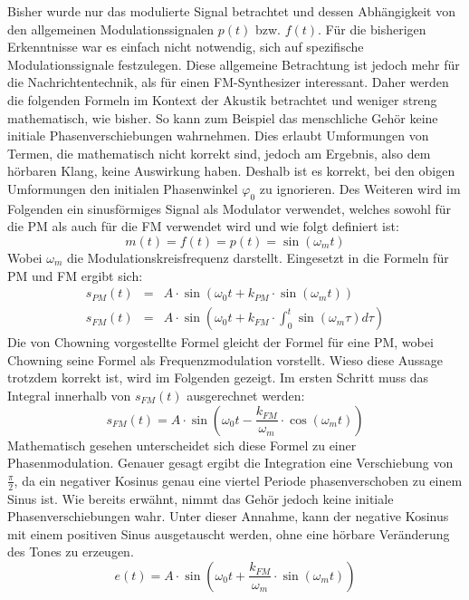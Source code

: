 Bisher wurde nur das modulierte Signal betrachtet und dessen Abhängigkeit von den allgemeinen Modulationssignalen \(p(t)\) bzw. \(f(t)\). Für die bisherigen Erkenntnisse war es einfach nicht notwendig, sich auf spezifische Modulationssignale festzulegen. Diese allgemeine Betrachtung ist jedoch mehr für die Nachrichtentechnik, als für einen FM-Synthesizer interessant.
Daher werden die folgenden Formeln im Kontext der Akustik betrachtet und weniger streng mathematisch, wie bisher. So kann zum Beispiel das menschliche Gehör keine initiale Phasenverschiebungen wahrnehmen. Dies erlaubt Umformungen von Termen, die mathematisch nicht korrekt sind, jedoch am Ergebnis, also dem hörbaren Klang, keine Auswirkung haben. Deshalb ist es korrekt, bei den obigen Umformungen den initialen Phasenwinkel $\varphi_0$ zu ignorieren. Des Weiteren wird im Folgenden ein sinusförmiges Signal als Modulator verwendet, welches sowohl für die PM als auch für die FM verwendet wird und wie folgt definiert ist:
\begin{equation}
m(t)=f(t)=p(t)=\sin(\omega_m t)
\end{equation}
Wobei \(\omega_m\) die Modulationskreisfrequenz darstellt. Eingesetzt in die Formeln für PM und FM ergibt sich:
\begin{eqnarray*}
s_{PM}(t)&=&A\cdot\sin(\omega_0t+k_{PM}\cdot\sin(\omega_m t)) \\
s_{FM}(t)&=&A\cdot\sin(\omega_0t+k_{FM}\cdot\int_0^t{\sin(\omega_m \tau)} d\tau)
\end{eqnarray*}
Die von Chowning vorgestellte Formel gleicht der Formel für eine PM, \cite{chowningPaper} wobei Chowning seine Formel als Frequenzmodulation vorstellt. Wieso diese Aussage trotzdem korrekt ist, wird im Folgenden gezeigt. Im ersten Schritt muss das Integral innerhalb von \(s_{FM}(t)\) ausgerechnet werden:
\begin{equation*}
s_{FM}(t)=A\cdot\sin(\omega_0t-\frac{k_{FM}}{\omega_m}\cdot\cos(\omega_m t))
\end{equation*}
Mathematisch gesehen unterscheidet sich diese Formel zu einer Phasenmodulation. Genauer gesagt ergibt die Integration eine Verschiebung von $\frac{\pi}{2}$, da ein negativer Kosinus genau eine viertel Periode phasenverschoben zu einem Sinus ist. Wie bereits erwähnt, nimmt das Gehör jedoch keine initiale Phasenverschiebungen wahr. Unter dieser Annahme, kann der negative Kosinus mit einem positiven Sinus ausgetauscht werden, ohne eine hörbare Veränderung des Tones zu erzeugen.
\begin{equation*}
e(t)=A\cdot\sin(\omega_0t+\frac{k_{FM}}{\omega_m}\cdot\sin(\omega_m t))
\end{equation*}
